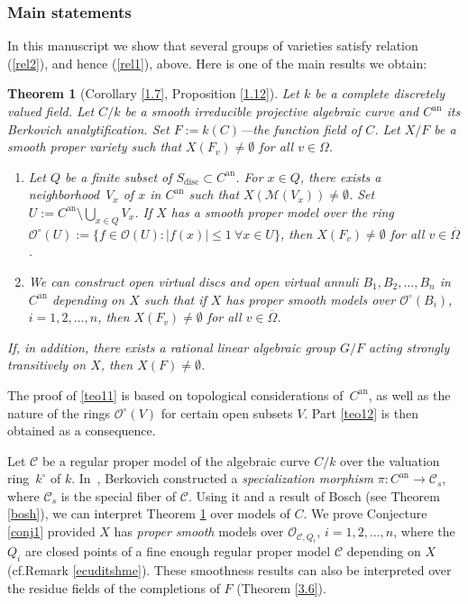 \documentclass[10pt]{amsart}
\newcommand{\cf}{cf.}
\let\backslash\setminus
\newtheorem{thm}{Theorem}[section]
\theoremstyle{definition}
\begin{document}
\subsubsection*{Main statements}
In this manuscript we show that several groups of varieties satisfy relation (\ref{rel2}), and hence (\ref{rel1}), above. Here is one of the main results we obtain:
\begin{thm}[Corollary \ref{1.7}, Proposition \ref{1.12}] \label{teo1} Let $k$ be a complete discretely valued field. Let $C/k$ be a smooth irreducible projective algebraic curve and $C^{\mathrm{an}}$ its Berkovich analytification. Set $F:=k(C)$---the function field of $C$. Let $X/F$ be a smooth proper variety such that $X(F_v) \neq \emptyset$ for all $v \in \Omega$.
\begin{enumerate}
\item\label{teo11} Let $Q$ be a finite subset of $S_{\mathrm{disc}} \subset C^{\mathrm{an}}$. For $x \in Q$, there exists a neighborhood~$V_x$ of $x$ in $C^{\mathrm{an}}$ such that $X(\mathscr{M}(V_x)) \neq \emptyset$.
Set $U:=C^{\mathrm{an}} \backslash \bigcup_{x \in Q} V_x$.
If $X$ has a \emph{smooth proper} model over the ring $\mathcal{O}^{\circ}(U):=\{f \in \mathcal{O}(U): |f(x)| \leqslant 1 \ \forall x \in U\}$, then $X(F_v) \neq \emptyset$ for all $v \in \overline{\Omega}$.
\item\label{teo12}
We can construct open \emph{virtual discs} and open \emph{virtual annuli} $B_1, B_2, \dots, B_n$ in~$C^{\mathrm{an}}$ depending on $X$ such that if $X$ has proper smooth models over $\mathcal{O}^{\circ}(B_i)$, ${i=1,2,\dots, n}$, then $X(F_v) \neq \emptyset$ for all $v \in \overline{\Omega}$.
\end{enumerate}

If, in addition, there exists a rational linear algebraic group $G/F$ acting strongly transitively on $X$, then $X(F) \neq \emptyset$.
\end{thm}
The proof of \eqref{teo11} is based on topological considerations of~$C^{\mathrm{an}}$, as well as the nature of the rings $\mathcal{O}^{\circ}(V)$ for certain open subsets $V$. Part \eqref{teo12} is then obtained as a consequence.

Let $\mathcal{C}$ be a regular proper model of the algebraic curve $C/k$ over the valuation ring~$k^{\circ}$ of $k$.
In~\cite{ber}, Berkovich constructed a \emph{specialization morphism} $\pi: C^{\mathrm{an}} \to \mathcal{C}_s$, where $\mathcal{C}_s$ is the special fiber of $\mathcal{C}$. Using it and a result of Bosch (see Theorem \ref{bosh}), we can interpret Theorem \ref{teo1} over models of $C$. We prove Conjecture \ref{conj1} provided $X$ has \emph{proper smooth} models over $\mathcal{O}_{\mathscr{C}, Q_i}$, $i=1,2,\dots, n$, where the $Q_i$ are closed points of a fine enough regular proper model $\mathscr{C}$ depending on $X$ (\cf Remark \ref{ecuditshme}).
These smoothness results can also be interpreted over the residue fields of the completions of $F$ (Theorem \ref{3.6}).
\end{document}
